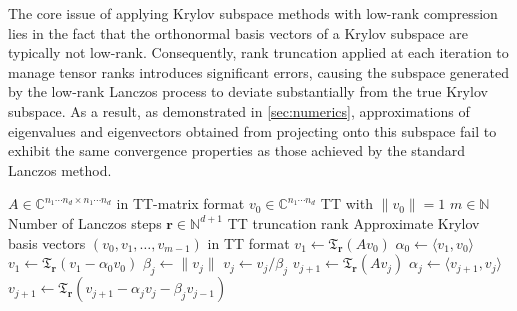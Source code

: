\documentclass[10pt,preprint]{elsarticle}
\begin{document}
\begin{appendices}
The core issue of applying Krylov subspace methods with low-rank compression lies in the fact that the orthonormal basis vectors of a Krylov subspace are typically not low-rank. Consequently, rank truncation applied at each iteration to manage tensor ranks introduces significant errors, causing the subspace generated by the low-rank Lanczos process to deviate substantially from the true Krylov subspace. As a result, as demonstrated in \cref{sec:numerics}, approximations of eigenvalues and eigenvectors obtained from projecting onto this subspace fail to exhibit the same convergence properties as those achieved by the standard Lanczos method. 

\begin{algorithm}
\caption{Lanczos iteration with rank truncation}
\label{alg:TT-Lanczos}
\begin{algorithmic}[1]
\Require
\Statex \hspace{1em} $A \in \mathbb{C}^{n_1\cdots n_d \times n_1\cdots n_d}$ in TT-matrix format
\Statex \hspace{1em} $v_0 \in \mathbb{C}^{n_1\cdots n_d}$ TT with $\|v_0\|=1$
\Statex \hspace{1em} $m \in \mathbb{N}$ Number of Lanczos steps
\Statex \hspace{1em} $\bm r \in \mathbb{N}^{d+1}$ TT truncation rank
\Ensure
\Statex \hspace{1em} Approximate Krylov basis vectors $(v_0, v_1, \ldots, v_{m-1})$ in TT format
\vspace{0.5em}
\State $v_1 \gets \mathfrak{T}_{\bm r}(A v_0)$ 
\State $\alpha_0 \gets \langle v_1, v_0 \rangle$ 
\State $v_1 \gets \mathfrak{T}_{\bm r}(v_1 - \alpha_0 v_0)$ 
    \State $\beta_j \gets \|v_j\|$ 
    \State $v_j \gets v_j / \beta_j$ 
    \State $v_{j+1} \gets \mathfrak{T}_{\bm r}(A v_j)$ 
    \State $\alpha_j \gets \langle v_{j+1}, v_j \rangle$ 
    \State $v_{j+1} \gets \mathfrak{T}_{\bm r}(v_{j+1} - \alpha_j v_j - \beta_j v_{j-1})$ 
\EndFor
\end{algorithmic}
\end{algorithm}


\end{appendices}
\end{document}
